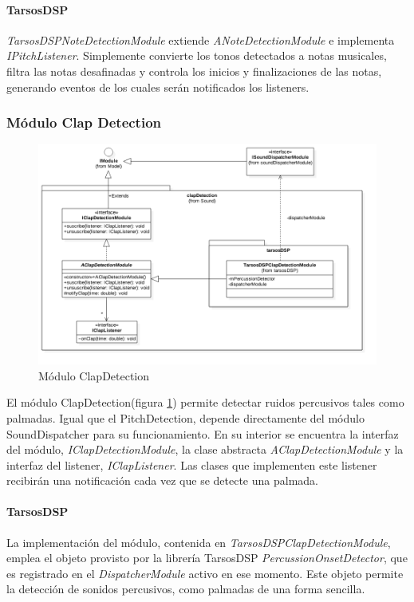  \paragraph*{TarsosDSP\\}%
 
 \textit{TarsosDSPNoteDetectionModule} extiende \textit{ANoteDetectionModule} e implementa \textit{IPitchListener}. Simplemente convierte los tonos detectados a notas musicales, filtra las notas desafinadas y controla los inicios y finalizaciones de las notas, generando eventos de los cuales serán notificados los listeners.
 
\subsubsection{Módulo Clap Detection}
\begin{figure}
	\centering
	\includegraphics[width=1\linewidth]{imagenes/diagramas/ClapDetectionModule.png}
	\caption{Módulo ClapDetection}
	\label{fig:clap-detection-module}
\end{figure}
El módulo ClapDetection(figura \ref{fig:clap-detection-module}) permite detectar ruidos percusivos tales como palmadas. Igual que el PitchDetection, depende directamente del módulo SoundDispatcher para su funcionamiento. En su interior se encuentra la interfaz del módulo, \textit{IClapDetectionModule}, la clase abstracta \textit{AClapDetectionModule} y la interfaz del listener, \textit{IClapListener}. Las clases que implementen este listener recibirán una notificación cada vez que se detecte una palmada.
\paragraph*{TarsosDSP\\} 
La implementación del módulo, contenida en \textit{TarsosDSPClapDetectionModule}, emplea el objeto provisto por la librería TarsosDSP \textit{PercussionOnsetDetector}, que es registrado en el \textit{DispatcherModule} activo en ese momento. Este objeto permite la detección de sonidos percusivos, como palmadas de una forma sencilla.

